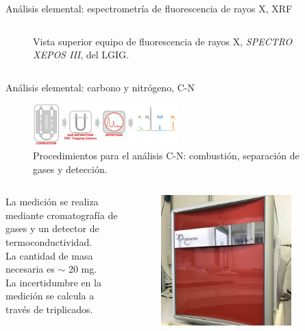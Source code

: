 \documentclass[9pt]{beamer}
\begin{document}
\begin{frame}{Análisis elemental: espectrometría de fluorescencia de rayos X, XRF}
\begin{columns}
\begin{column}{0.38\textwidth}
\begin{figure}
			\caption{\justifying Vista superior equipo de fluorescencia de rayos X, \textit{SPECTRO XEPOS III}, del LGIG.}
			\end{figure}
		\end{column}
	\end{columns}
\end{frame}

\begin{frame}{Análisis elemental: carbono y nitrógeno, C-N}
	\begin{figure}
		\centering
		\includegraphics[width=0.5\textwidth]{Imagenes/C-N-Detection.png}
		\caption{\justifying Procedimientos para el análisis C-N: combustión, separación de gases y detección\footnotemark[1].}
	\end{figure}
	\begin{columns}
		\begin{column}{0.68\textwidth}
			\justifying
La medición se realiza mediante cromatografía de gases y un detector de termoconductividad.
\\ \vspace{0.5cm}
			La cantidad de masa necesaria es $\sim$ 20 mg. 
			\\\vspace{0.5cm}
			La incertidumbre en la medición se calcula a través de triplicados.
		\end{column}
		\begin{column}{0.3\textwidth}  
		\begin{figure}
			\centering
			\includegraphics[width=0.8\textwidth]{Imagenes/Elementar.jpg}

\end{figure}
\end{column}
\end{columns}
\end{frame}
\end{document}
